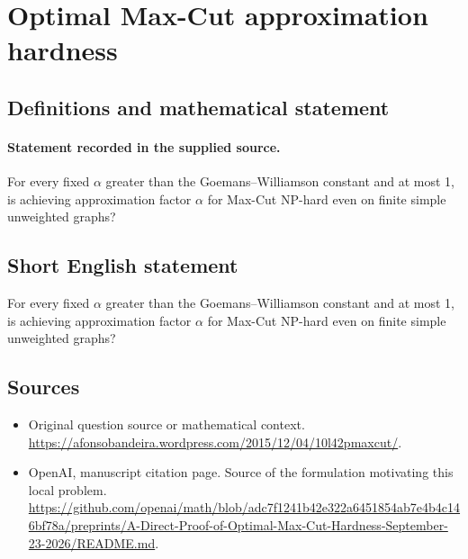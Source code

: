 \documentclass[11pt]{article}
\begin{document}
\section*{Optimal Max-Cut approximation hardness}\label{statement}
\subsection{Definitions and mathematical statement}
\paragraph{Statement recorded in the supplied source.}
For every fixed $\alpha $ greater than the Goemans–Williamson constant and at most 1, is achieving approximation factor $\alpha $ for Max-Cut NP-hard even on finite simple unweighted graphs?
\subsection{Short English statement}
For every fixed $\alpha $ greater than the Goemans–Williamson constant and at most 1, is achieving approximation factor $\alpha $ for Max-Cut NP-hard even on finite simple unweighted graphs?
\subsection{Sources}
\begin{itemize}
\item[S1] Original question source or mathematical context.
\url{https://afonsobandeira.wordpress.com/2015/12/04/10l42pmaxcut/}.
\item[S2] OpenAI, manuscript citation page. Source of the formulation motivating this local problem.
\url{https://github.com/openai/math/blob/adc7f1241b42e322a6451854ab7e4b4c146bf78a/preprints/A-Direct-Proof-of-Optimal-Max-Cut-Hardness-September-23-2026/README.md}.
\end{itemize}
\end{document}
